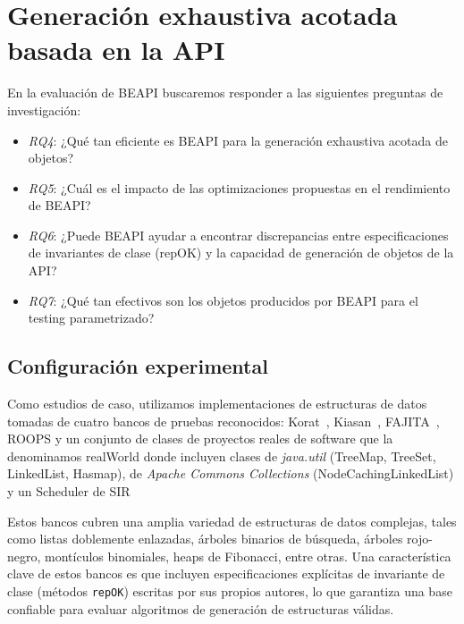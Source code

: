 


\section{Generación exhaustiva acotada basada en la API}
\label{sec:experimentalBeapi}

En la evaluación de BEAPI buscaremos responder a las siguientes preguntas de
investigación:

\begin{itemize}
\item \emph{RQ4}: ¿Qué tan eficiente es BEAPI para la generación exhaustiva                                                                                       
    acotada de objetos?
\item\emph{RQ5}: ¿Cuál es el impacto de las optimizaciones propuestas en el
    rendimiento de BEAPI?
\item\emph{RQ6}: ¿Puede BEAPI ayudar a encontrar discrepancias entre
    especificaciones de invariantes de clase (repOK) y la capacidad de generación de objetos de la API?
\item\emph{RQ7}: ¿Qué tan efectivos son los objetos producidos por BEAPI para el
    testing parametrizado?  
\end{itemize}

\subsection{Configuración experimental}

Como estudios de caso, utilizamos implementaciones de estructuras de datos tomadas de cuatro bancos 
de pruebas reconocidos: \textsf{Korat}~\cite{Boyapati02}, \textsf{Kiasan}~\cite{Deng06}, 
\textsf{FAJITA}~\cite{Abad13}, \textsf{ROOPS} y un conjunto de clases de proyectos reales de software que la denominamos \textsf{realWorld}
donde incluyen clases de \emph{java.util} (TreeMap, TreeSet, LinkedList, Hasmap), de \emph{Apache Commons Collections} (NodeCachingLinkedList) y un Scheduler de SIR

Estos bancos cubren una amplia variedad de estructuras de datos complejas, tales como listas doblemente enlazadas, árboles binarios de búsqueda, 
árboles rojo-negro, montículos binomiales, heaps de Fibonacci, entre otras. Una característica clave 
de estos bancos es que incluyen especificaciones explícitas de invariante de clase (métodos 
\texttt{repOK}) escritas por sus propios autores, lo que garantiza una base confiable para evaluar 
algoritmos de generación de estructuras válidas.

